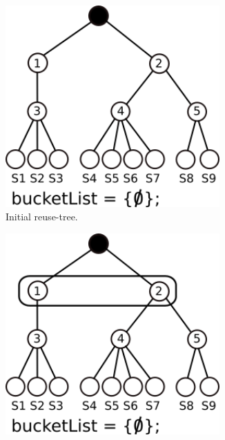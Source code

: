 \begin{figure}[h!]
	 \centering
	 \begin{subfigure}[t]{0.22\textwidth}
			 \includegraphics[width=0.9\textwidth]{img/trma-full-merge1}
			 \caption{Initial reuse-tree.}
			 \label{fig:trma-full-merge-p1}
	 \end{subfigure}
	 \hspace{3mm}
	 \begin{subfigure}[t]{0.22\textwidth}
				\includegraphics[width=0.9\textwidth]{img/trma-full-merge2}

\end{subfigure}
\end{figure}
